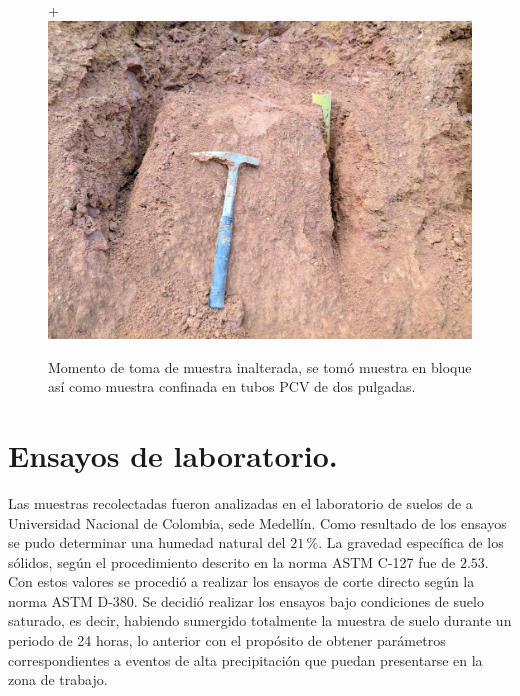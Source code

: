 \begin{figure}[H]+
\centering
\includegraphics[scale=0.20]{img/estacion11.jpg}
\caption{Momento de toma de muestra inalterada, se tom\'o muestra en bloque as\'i como muestra confinada en tubos PCV de dos pulgadas.}
\label{fig:toma-bloque}
\end{figure}

\section{Ensayos de laboratorio.}
\label{ensayoslab}

Las muestras recolectadas fueron analizadas en el laboratorio de suelos de a Universidad Nacional de Colombia, sede Medell\'in.
Como resultado de los ensayos se pudo determinar una humedad natural del \(21\,\%\).
La gravedad espec\'ifica de los s\'olidos, seg\'un el procedimiento descrito en la norma ASTM C-127 fue de \(2.53\).
Con estos valores se procedi\'o a realizar los ensayos de corte directo seg\'un la norma ASTM D-380. Se decidi\'o realizar los ensayos bajo condiciones de suelo saturado, es decir, habiendo sumergido totalmente la muestra de suelo durante un periodo de 24 horas, lo anterior con el prop\'osito de obtener par\'ametros correspondientes a eventos de alta precipitaci\'on que puedan presentarse en la zona de trabajo.

